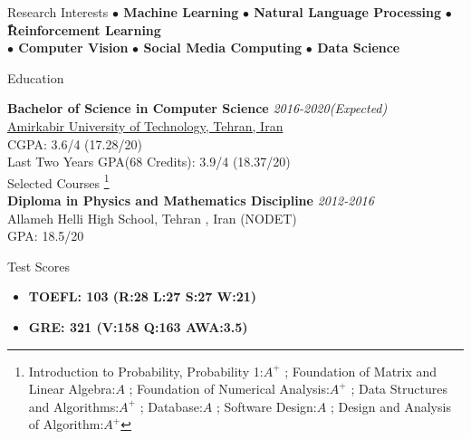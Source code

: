 \documentclass{resume} %
\begin{document}
	
	\begin{rSection}{Research Interests}
			\textbf{$\bullet$ Machine Learning} \hspace*{16pt}
			\textbf{ $\bullet$ Natural Language Processing}\hspace*{16pt}
			\textbf{ $\bullet$ ًReinforcement Learning}\hspace*{16pt}\\
			\textbf{ $\bullet$ Computer Vision}\hspace*{16pt}
			\textbf{ $\bullet$ Social Media Computing}	\hspace*{16pt}	
			\textbf{ $\bullet$ Data Science}\hspace*{16pt}


	\end{rSection}
	
	
	\begin{rSection}{Education}
		
		{\bf Bachelor of Science in Computer Science} \hfill {\em 2016-2020(Expected)} \\ 
		\href{https://www.topuniversities.com/universities/amirkabir-university-technology}{Amirkabir University of Technology, Tehran, Iran}\\
		CGPA: 3.6/4 (17.28/20)\\
		Last Two Years GPA(68 Credits): 3.9/4 (18.37/20)\\
		Selected Courses
		\footnote{Introduction to Probability, Probability 1:$A^{+}$ ; Foundation of Matrix and Linear Algebra:$A$ ; Foundation of Numerical Analysis:$A^{+}$ ;  Data Structures and Algorithms:$A^{+}$ ; Database:$A$ ; Software Design:$A$ ; Design and Analysis of Algorithm:$A^{+}$}\\
		{\bf Diploma in Physics and Mathematics Discipline} \hfill {\em 2012-2016}\\ 
		Allameh Helli High School, Tehran , Iran (NODET)\\
		GPA: 18.5/20
	\end{rSection}
	\begin{rSection}{Test Scores}
		\begin{itemize}{\bfseries}
			\item {\bfseries TOEFL: 103 (R:28 L:27 S:27 W:21)}
			\item {\bfseries GRE: 321 (V:158 Q:163 AWA:3.5)}
		\end{itemize}
		
	\end{rSection}
	
\end{document}

